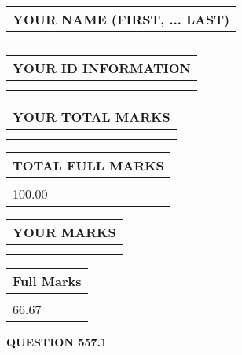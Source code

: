 \documentclass{ctexart}
\begin{document}
   
   
   
\newpage 
\setcounter{page}{ 
   557001 } 
   
   
   
   
\noindent\begin{tabular}{|l|}
\hline
YOUR NAME (FIRST, ... LAST)  \\
\hline
 \\ 
 \\ 
\hline
\end{tabular}
\hspace{0.05in} \begin{tabular}{|l|}
\hline
 YOUR   ID   INFORMATION  \\
\hline
 \\ 
 \\ 
\hline
\end{tabular}
   
   
\vspace{0.2in}\noindent\begin{tabular}{|l|}
\hline
YOUR TOTAL MARKS  \\
\hline
 \\ 
 \\ 
\hline
\end{tabular}
\hspace{0.05in} \begin{tabular}{|l|}
\hline
TOTAL FULL MARKS  \\
\hline
 \\ 
100.00 \\
\hline
\end{tabular}
   
   
 \vspace{0.2in}
 
 
 
 
   
   
  
\vspace{0.2in}
  
\noindent\begin{tabular}{|l|}
\hline
 YOUR MARKS  \\
\hline
 \\ 
 \\ 
\hline
\end{tabular}
\hspace{0.05in} \begin{tabular}{|l|}
\hline
 Full Marks  \\
\hline
 \\ 
66.67 \\
\hline
\end{tabular}
{\textbf{\Large{QUESTION
557.1 
}}}
  
\end{document}
